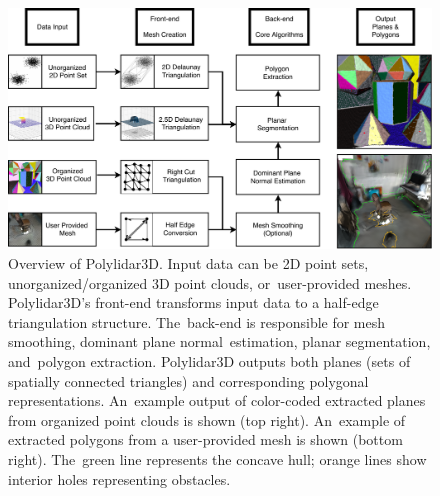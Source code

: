 \begin{figure}[t]
    \centering
    \includegraphics[width=0.85\linewidth]{chapter_3_polylidar3d/imgs/Polylidar3DArchitecture-SimplifedV4.pdf}
    \caption{Overview of Polylidar3D. Input data can be 2D point sets, unorganized/organized 3D point clouds, or~user-provided meshes. Polylidar3D's front-end transforms input data to a half-edge triangulation structure. The~back-end is responsible for mesh smoothing, dominant plane normal~estimation, planar segmentation, and~polygon extraction. Polylidar3D outputs both planes (sets of spatially connected triangles) and corresponding polygonal representations. An~example output of color-coded extracted planes from organized point clouds is shown (top right). An~example of extracted polygons from a user-provided mesh is shown (bottom right). The~green line represents the concave hull; orange lines show interior holes representing obstacles.} %
    \label{fig:ch3_polylidar_overview}
\end{figure}


